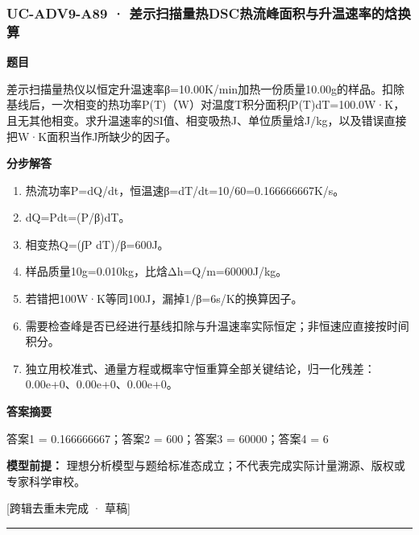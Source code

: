 \documentclass[UTF8,11pt,a4paper]{ctexart}
\begin{document}
\subsubsection*{UC-ADV9-A89 · 差示扫描量热DSC热流峰面积与升温速率的焓换算}
\noindent\textbf{题目}\par
差示扫描量热仪以恒定升温速率β=10.00K/min加热一份质量10.00g的样品。扣除基线后，一次相变的热功率P(T)（W）对温度T积分面积∫P(T)dT=100.0W·K，且无其他相变。求升温速率的SI值、相变吸热J、单位质量焓J/kg，以及错误直接把W·K面积当作J所缺少的因子。\par
\medskip\noindent\textbf{分步解答}
\begin{enumerate}
\item 热流功率P=dQ/dt，恒温速β=dT/dt=10/60=0.166666667K/s。
\item dQ=Pdt=(P/β)dT。
\item 相变热Q=(∫P dT)/β=600J。
\item 样品质量10g=0.010kg，比焓Δh=Q/m=60000J/kg。
\item 若错把100W·K等同100J，漏掉1/β=6s/K的换算因子。
\item 需要检查峰是否已经进行基线扣除与升温速率实际恒定；非恒速应直接按时间积分。
\item 独立用校准式、通量方程或概率守恒重算全部关键结论，归一化残差：0.00e+0、0.00e+0、0.00e+0。
\end{enumerate}
\noindent\textbf{答案摘要}\par
答案1 = 0.166666667；答案2 = 600；答案3 = 60000；答案4 = 6\par
\noindent\textbf{模型前提：}
理想分析模型与题给标准态成立；不代表完成实际计量溯源、版权或专家科学审校。\par
\noindent\textcolor{red!65!black}{[跨辑去重未完成 · 草稿]} \par
\medskip\hrule\medskip
{}
\end{document}
